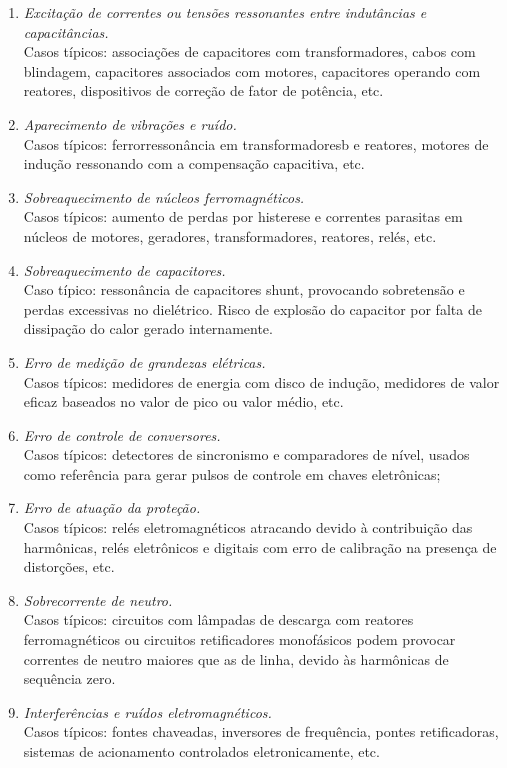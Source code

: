 \documentclass[a4paper,12pt,oneside,openany,table,xcdraw]{article}
\begin{document}
\begin{enumerate}[1. ]
\item \emph{Excitação de correntes ou tensões ressonantes entre indutâncias e capacitâncias.}\\
Casos típicos: associações de capacitores com transformadores, cabos com blindagem,
capacitores associados com motores, capacitores operando com reatores, dispositivos de
correção de fator de potência, etc.

\item \emph{Aparecimento de vibrações e ruído.}\\
Casos típicos: ferrorressonância em transformadoresb
e reatores, motores de indução
ressonando com a compensação capacitiva, etc.

\item \emph{Sobreaquecimento de núcleos ferromagnéticos.}\\
Casos típicos: aumento de perdas por histerese e correntes parasitas em núcleos de motores,
geradores, transformadores, reatores, relés, etc.

\item \emph{Sobreaquecimento de capacitores.}\\
Caso típico: ressonância de capacitores shunt, provocando sobretensão e perdas excessivas
no dielétrico. Risco de explosão do capacitor por falta de dissipação do calor gerado
internamente.

\item \emph{Erro de medição de grandezas elétricas.}\\
Casos típicos: medidores de energia com disco de indução, medidores de valor eficaz
baseados no valor de pico ou valor médio, etc.

\item \emph{Erro de controle de conversores.}\\
Casos típicos: detectores de sincronismo e comparadores de nível, usados como referência
para gerar pulsos de controle em chaves eletrônicas;

\item \emph{Erro de atuação da proteção.}\\
Casos típicos: relés eletromagnéticos atracando devido à contribuição das harmônicas, relés
eletrônicos e digitais com erro de calibração na presença de distorções, etc.

\item \emph{Sobrecorrente de neutro.}\\
Casos típicos: circuitos com lâmpadas de descarga com reatores ferromagnéticos ou
circuitos retificadores monofásicos podem provocar correntes de neutro maiores que as de
linha, devido às harmônicas de sequência zero.

\item \emph{Interferências e ruídos eletromagnéticos.}\\
Casos típicos: fontes chaveadas, inversores de frequência, pontes retificadoras, sistemas de
acionamento controlados eletronicamente, etc.
\end{enumerate}
\end{document}
